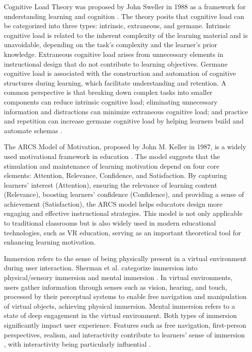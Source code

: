 \documentclass[sigconf,review,anonymous]{acmart}
\begin{document}
Cognitive Load Theory was proposed by John Sweller in 1988 as a framework for understanding learning and cognition \cite{sweller1988cognitive}. The theory posits that cognitive load can be categorized into three types: intrinsic, extraneous, and germane. Intrinsic cognitive load is related to the inherent complexity of the learning material and is unavoidable, depending on the task's complexity and the learner's prior knowledge. Extraneous cognitive load arises from unnecessary elements in instructional design that do not contribute to learning objectives. Germane cognitive load is associated with the construction and automation of cognitive structures during learning, which facilitate understanding and retention. A common perspective is that breaking down complex tasks into smaller components can reduce intrinsic cognitive load; eliminating unnecessary information and distractions can minimize extraneous cognitive load; and practice and repetition can increase germane cognitive load by helping learners build and automate schemas \cite{baceviciute2022investigating}.

The ARCS Model of Motivation, proposed by John M. Keller in 1987, is a widely used motivational framework in education \cite{keller1987development}. The model suggests that the stimulation and maintenance of learning motivation depend on four core elements: Attention, Relevance, Confidence, and Satisfaction. By capturing learners' interest (Attention), ensuring the relevance of learning content (Relevance), boosting learners' confidence (Confidence), and providing a sense of achievement (Satisfaction), the ARCS model helps educators design more engaging and effective instructional strategies. This model is not only applicable to traditional classrooms but is also widely used in modern educational technologies, such as VR education, serving as an important theoretical tool for enhancing learning motivation.

Immersion refers to the sense of being physically present in a virtual environment during user interaction. Sherman et al. categorize immersion into physical/sensory immersion and mental immersion \cite{sherman2003understanding}. In virtual environments, users gather information through senses such as vision, hearing, and touch, processed by their perceptual systems to enable free navigation and manipulation of virtual objects, achieving physical immersion. Mental immersion refers to a state of deep engagement in the virtual environment. Both types of immersion significantly impact user experience. Features such as free navigation, first-person perspectives, realism, and interactivity contribute to learners' sense of immersion \cite{regenbrecht2002real, mikropoulos2006presence}, with interactivity being particularly influential \cite{schubert2001experience}.
\end{document}
